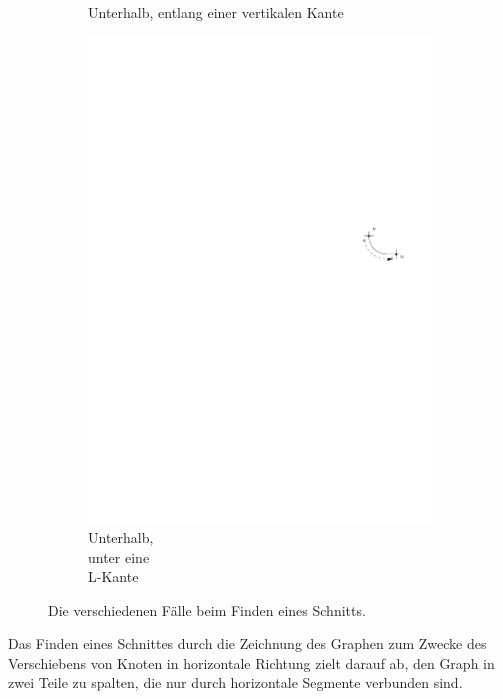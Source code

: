 \documentclass[a4paper]{scrreprt}
\theoremstyle{definition}
\begin{document}
\begin{figure}[h]
\begin{subfigure}[b]{0.2\textwidth}
                \caption{Unterhalb, entlang einer vertikalen Kante}
                \label{fig:cutfinding_bot_vertical}
        \end{subfigure}
        \quad
        \begin{subfigure}[b]{0.2\textwidth}
                \includegraphics[width=\textwidth]{schnitt_finden/bot_belowL}
                \caption{Unterhalb, \\ unter eine \\ L-Kante}
                \label{fig:cutfinding_bot_belowL}
        \end{subfigure}
        \caption{Die verschiedenen Fälle beim Finden eines Schnitts.}\label{fig:cutfinding}
\end{figure}


Das Finden eines Schnittes durch die Zeichnung des Graphen zum Zwecke des Verschiebens von Knoten in horizontale Richtung zielt darauf ab, den Graph in zwei Teile zu spalten, die nur durch horizontale Segmente verbunden sind. 
\end{document}
